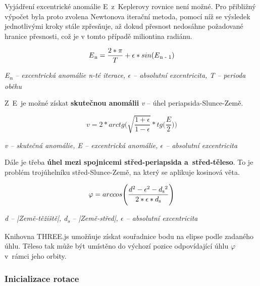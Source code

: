 \documentclass[a4paper,12pt]{article}
\begin{document}

\vspace*{-0.5cm}
Vyjádření excentrické anomálie E~z~Keplerovy rovnice není možné. Pro přibližný výpočet byla proto zvolena Newtonova iterační metoda, pomocí níž se výsledek jednotlivými kroky stále zpřesňuje, až dokud přesnost nedosáhne požadované hranice přesnosti, což je v tomto případě miliontina radiánu.

\vspace*{-0.5cm}
$$E\textsubscript{n} = \frac{2 * \pi}{T} + \epsilon * sin(E\textsubscript{n - 1})$$
\begin{center}
\textit{E\textsubscript{n} -- excentrická anomálie n-té iterace, $\epsilon$ -- absolutní excentricita, T -- perioda oběhu}~\cite{michalrepik}
\end{center}

Z~E~je možné získat \textbf{skutečnou anomálii} \textit{v} -- úhel periapsida-Slunce-Země.

\vspace*{-0.5cm}
$$v = 2 * arctg\Bigg(\sqrt{\frac{1 + \epsilon}{1 - \epsilon}} * tg\bigg(\frac{E}{2}\bigg)\Bigg)$$
\begin{center}
\textit{v -- skutečná anomálie, E -- excentrická anomálie, $\epsilon$ -- absolutní excentricita}~\cite{michalrepik}
\end{center}

Dále je třeba \textbf{úhel mezi spojnicemi střed-periapsida a~střed-těleso}. To je problém trojúhelníku střed-Slunce-Země, na který se aplikuje kosinová věta.

\vspace*{-0.5cm}
$$\varphi = arccos\Bigg(\frac{d^2 - \epsilon^2 - d\textsubscript{s}^2}{2 * \epsilon * d\textsubscript{s}}\Bigg)$$
\begin{center}
\textit{d -- |Země-těžiště|, d\textsubscript{s} -- |Země-střed|, $\epsilon$ -- absolutní excentricita}~\cite{michalrepik}
\end{center}

Knihovna THREE.js umožňuje získat souřadnice bodu na elipse podle zadaného úhlu. Těleso tak může být umístěno do výchozí pozice odpovídající úhlu $\varphi$ v~rámci jeho orbity.

\subsubsection{Inicializace rotace}
\end{document}
